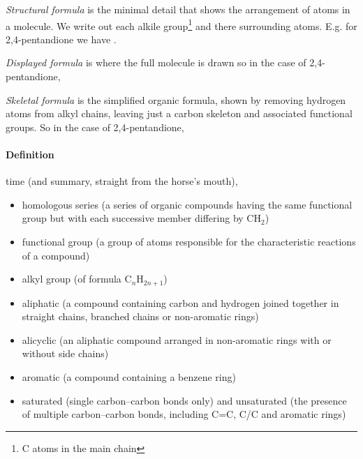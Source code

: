 	\textit{Structural formula} is the minimal detail that shows the arrangement of atoms in a molecule.
	We write out each alkile group\footnote{C atoms in the main chain} and there surrounding atoms.
	E.g. for 2,4-pentandione we have .
	
	\textit{Displayed formula} is where the full molecule is drawn so in the case of 2,4-pentandione,
	
	\begin{center}
	\end{center}
	
	\textit{Skeletal formula} is the simplified organic formula, shown by removing hydrogen atoms from alkyl chains, leaving just a carbon skeleton and associated functional groups.
	So in the case of 2,4-pentandione,
	
	\begin{center}
	\end{center}
	
	\paragraph{Definition} time (and summary, straight from the horse's mouth),
	\begin{itemize}
		\item homologous series (a series of organic compounds having the same functional group but with each successive member differing by CH$_2$)
		\item functional group (a group of atoms responsible for the characteristic reactions of a compound)
		\item alkyl group (of formula C$_n$H$_{2n+1}$)
		\item aliphatic (a compound containing carbon and hydrogen joined together in straight chains, branched chains or non-aromatic rings)
		\item alicyclic (an aliphatic compound arranged in non-aromatic rings with or without side chains)
		\item aromatic (a compound containing a benzene ring)
		\item saturated (single carbon–carbon bonds only) and unsaturated (the presence of multiple carbon–carbon bonds, including C=C, C/C and  aromatic rings)
	\end{itemize}
	
